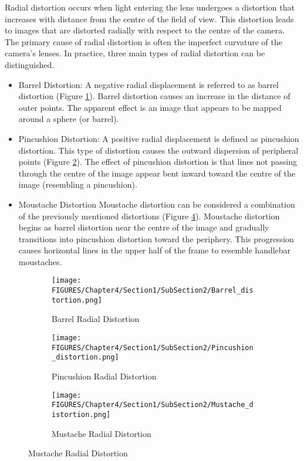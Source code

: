 Radial distortion occurs when light entering the lens undergoes a distortion that increases with distance from the centre of the field of view. This distortion leads to images that are distorted radially with respect to the centre of the camera. 
The primary cause of radial distortion is often the imperfect curvature of the camera’s lenses. In practice, three main types of radial distortion can be distinguished.

\begin{itemize}
  \item Barrel Distortion:
A negative radial displacement is referred to as barrel distortion (Figure \ref{fig:barrel_distortion}). Barrel distortion causes an increase in the distance of outer points. The apparent effect is an image that appears to be mapped around a sphere (or barrel).
  \item Pincushion Distortion:
A positive radial displacement is defined as pincushion distortion.
This type of distortion causes the outward dispersion of peripheral points (Figure \ref{fig:pincushion_distortion}).
The effect of pincushion distortion is that lines not passing through the centre of the image appear bent inward toward the centre of the image (resembling a pincushion).
  \item Moustache  Distortion
Moustache distortion can be considered a combination of the previously mentioned distortions (Figure \ref{fig:mustache_distortion}). Moustache distortion begins as barrel distortion near the centre of the image and gradually transitions into pincushion distortion toward the periphery. This progression causes horizontal lines in the upper half of the frame to resemble handlebar moustaches.
\end{itemize}

\begin{figure}[htbp]
  \centering
  \begin{subfigure}[b]{0.3\textwidth}
      \centering
      \texttt{[image: FIGURES/Chapter4/Section1/SubSection2/Barrel\_distortion.png]}
      \caption{Barrel Radial Distortion}
      \label{fig:barrel_distortion}
  \end{subfigure}
  \hfill
  \begin{subfigure}[b]{0.3\textwidth}
      \centering
      \texttt{[image: FIGURES/Chapter4/Section1/SubSection2/Pincushion\_distortion.png]}
      \caption{Pincushion Radial Distortion}
      \label{fig:pincushion_distortion}
  \end{subfigure}
  \hfill
  \begin{subfigure}[b]{0.3\textwidth}
      \centering
      \texttt{[image: FIGURES/Chapter4/Section1/SubSection2/Mustache\_distortion.png]}
      \caption{Mustache Radial Distortion}
      \label{fig:mustache_distortion}
  \end{subfigure}
\end{figure}

